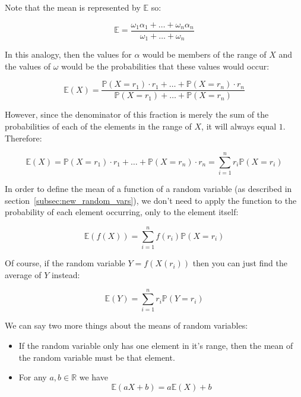 Note that the mean is represented by $\mathbb{E}$ so:

\begin{dmath*}
	\mathbb{E} = \frac{\omega_1\alpha_1 + \dots + \omega_n\alpha_n}{\omega_1 + \dots + \omega_n}
\end{dmath*}

In this analogy, then the values for $\alpha$ would be members of the range of
$X$ and the values of $\omega$ would be the probabilities that these values
would occur:

\begin{dmath*}
	\mathbb{E}(X) = \frac{\mathbb{P}(X = r_1) \cdot r_1 + \dots + \mathbb{P}(X = r_n) \cdot r_n}{\mathbb{P}(X = r_1) + \dots + \mathbb{P}(X = r_n)}
\end{dmath*}

However, since the denominator of this fraction is merely the sum of the
probabilities of each of the elements in the range of $X$, it will always equal
$1$. Therefore:

\begin{dmath*}
	\mathbb{E}(X) = {\mathbb{P}(X = r_1) \cdot r_1 + \dots + \mathbb{P}(X = r_n) \cdot r_n} = {\sum\limits_{i=1}^{n} r_i \mathbb{P}(X = r_i)}
\end{dmath*}

In order to define the mean of a function of a random variable (as described in
section~\ref{subsec:new_random_vars}), we don't need to apply the function to
the probability of each element occurring, only to the element itself:

\begin{dmath*}
	\mathbb{E}(f(X)) = {\sum\limits_{i=1}^{n} f(r_i) \mathbb{P}(X = r_i)}
\end{dmath*}

Of course, if the random variable $Y = f(X(r_i))$ then you can just find
the average of $Y$ instead:

\begin{dmath*}
	\mathbb{E}(Y) = {\sum\limits_{i=1}^{n} r_i \mathbb{P}(Y = r_i)}
\end{dmath*}

We can say two more things about the means of random variables:

\begin{itemize}
	\item If the random variable only has one element in it's range, then the mean of the random variable must be that element.
	\item For any $a, b \in \mathbb{R}$ we have
	\begin{dmath*}
		\mathbb{E}(aX + b) = a\mathbb{E}(X) + b
	\end{dmath*}
\end{itemize}

